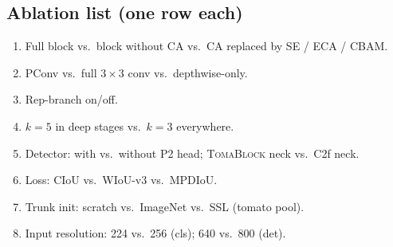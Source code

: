 \subsection{Ablation list (one row each)}
\begin{enumerate}[label=Abl-\arabic*]
  \item Full block vs.\ block without CA vs.\ CA replaced by SE / ECA / CBAM.
  \item PConv vs.\ full $3\times3$ conv vs.\ depthwise-only.
  \item Rep-branch on/off.
  \item $k=5$ in deep stages vs.\ $k=3$ everywhere.
  \item Detector: with vs.\ without P2 head; \textsc{TomaBlock} neck vs.\ C2f neck.
  \item Loss: CIoU vs.\ WIoU-v3 vs.\ MPDIoU.
  \item Trunk init: scratch vs.\ ImageNet vs.\ SSL (tomato pool).
  \item Input resolution: 224 vs.\ 256 (cls); 640 vs.\ 800 (det).
\end{enumerate}
